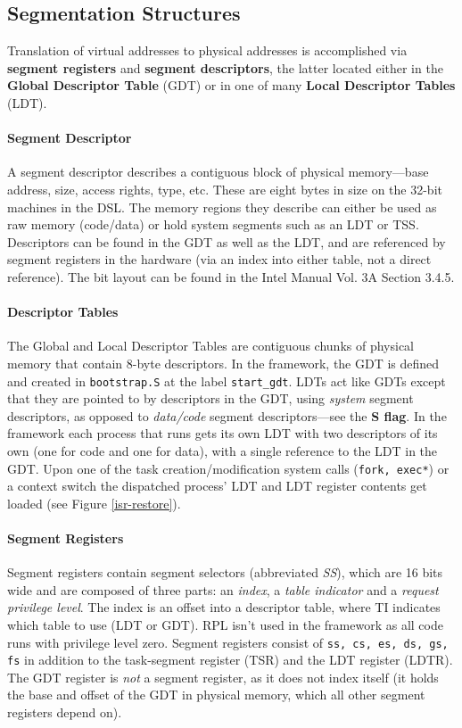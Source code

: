 \documentclass[titlepage]{article}
\begin{document}
% 
%

\subsection{Segmentation Structures}

Translation of virtual addresses to physical addresses is accomplished via
\textbf{segment registers} and \textbf{segment descriptors}, the latter located
either in the \textbf{Global Descriptor Table} (GDT) or in one of many
\textbf{Local Descriptor Tables} (LDT).

\paragraph{Segment Descriptor}
A segment descriptor describes a contiguous block of physical memory---base
address, size, access rights, type, etc. These are eight bytes in size on the
32-bit machines in the DSL. The memory regions they describe can either be used
as raw memory (code/data) or hold system segments such as an LDT or TSS.
Descriptors can be found in the GDT as well as the LDT, and are referenced by
segment registers in the hardware (via an index into either table, not a direct
reference). The bit layout can be found in the Intel Manual Vol. 3A Section
3.4.5.

\paragraph{Descriptor Tables}
The Global and Local Descriptor Tables are contiguous chunks of physical memory
that contain 8-byte descriptors. In the framework, the GDT is defined and
created in \verb|bootstrap.S| at the label \verb|start_gdt|. LDTs act like GDTs
except that they are pointed to by descriptors in the GDT, using \textit{system}
segment descriptors, as opposed to \textit{data/code} segment descriptors---see
the \textbf{S flag}. In the framework each process that runs gets its own LDT
with two descriptors of its own (one for code and one for data), with a single
reference to the LDT in the GDT. Upon one of the task creation/modification
system calls (\verb|fork, exec*|) or a context switch the dispatched process'
LDT and LDT register contents get loaded (see Figure \ref{isr-restore}).

\paragraph{Segment Registers}
Segment registers contain segment selectors (abbreviated \textit{SS}), which are
16 bits wide and are composed of three parts: an \textit{index}, a \textit{table
indicator} and a \textit{request privilege level}. The index is an offset into a
descriptor table, where TI indicates which table to use (LDT or GDT). RPL isn't
used in the framework as all code runs with privilege level zero.  Segment
registers consist of \verb|ss, cs, es, ds, gs, fs| in addition to the
task-segment register (TSR) and the LDT register (LDTR). The GDT register is
\textit{not} a segment register, as it does not index itself (it holds the base
and offset of the GDT in physical memory, which all other segment registers
depend on).
\end{document}
